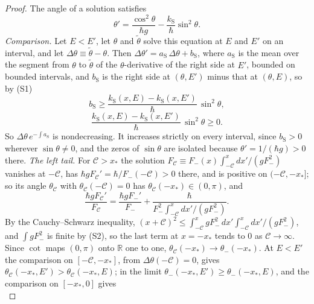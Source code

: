 \documentclass[aps,prd,onecolumn,tightenlines,nofootinbib,notitlepage,11pt,floatfix]{revtex4-2}
\theoremstyle{indentedtheorem}
\begin{document}
\begin{proof}
The angle of a solution satisfies
\begin{equation*}
    \theta' = \frac{\cos^2\theta}{\hbar g}-\frac{k_\text{S}}{\hbar}\sin^2\theta .
\end{equation*}
\emph{Comparison.} Let $E<E'$, let $\theta$ and $\tilde{\theta}$ solve this equation at $E$ and $E'$ on an interval, and let $\Delta\theta\equiv\tilde{\theta}-\theta$. Then $\Delta\theta'=a_\text{S}\,\Delta\theta+b_\text{S}$, where $a_\text{S}$ is the mean over the segment from $\theta$ to $\tilde{\theta}$ of the $\theta$-derivative of the right side at $E'$, bounded on bounded intervals, and $b_\text{S}$ is the right side at $(\theta,E')$ minus that at $(\theta,E)$, so by (S1)
\begin{equation*}
    b_\text{S} \geq \frac{k_\text{S}(x,E)-k_\text{S}(x,E')}{\hbar}\,\sin^2\theta ,
\end{equation*}
\begin{equation*}
    \frac{k_\text{S}(x,E)-k_\text{S}(x,E')}{\hbar}\,\sin^2\theta \geq 0 .
\end{equation*}
So $\Delta\theta\,e^{-\int a_\text{S}}$ is nondecreasing. It increases strictly on every interval, since $b_\text{S}>0$ wherever $\sin\theta\neq0$, and the zeros of $\sin\theta$ are isolated because $\theta'=1/(\hbar g)>0$ there.
\emph{The left tail.} For $\mathcal{C}>x_*$ the solution $F_\mathcal{C}\equiv F_-(x)\int_{-\mathcal{C}}^x dx'/(gF_-^2)$ vanishes at $-\mathcal{C}$, has $\hbar gF_\mathcal{C}'=\hbar/F_-(-\mathcal{C})>0$ there, and is positive on $(-\mathcal{C},-x_*]$; so its angle $\theta_\mathcal{C}$ with $\theta_\mathcal{C}(-\mathcal{C})=0$ has $\theta_\mathcal{C}(-x_*)\in(0,\pi)$, and
\begin{equation*}
    \frac{\hbar gF_\mathcal{C}'}{F_\mathcal{C}} = \frac{\hbar gF_-'}{F_-}+\frac{\hbar}{F_-^2\int_{-\mathcal{C}}^x dx'/(gF_-^2)} .
\end{equation*}
By the Cauchy--Schwarz inequality, $(x+\mathcal{C})^2\leq\int_{-\mathcal{C}}^xgF_-^2\,dx'\int_{-\mathcal{C}}^x dx'/(gF_-^2)$, and $\int gF_-^2$ is finite by (S2), so the last term at $x=-x_*$ tends to $0$ as $\mathcal{C}\to\infty$. Since $\cot$ maps $(0,\pi)$ onto $\mathbb{R}$ one to one, $\theta_\mathcal{C}(-x_*)\to\theta_-(-x_*)$. At $E<E'$ the comparison on $[-\mathcal{C},-x_*]$, from $\Delta\theta(-\mathcal{C})=0$, gives $\theta_\mathcal{C}(-x_*,E')>\theta_\mathcal{C}(-x_*,E)$; in the limit $\theta_-(-x_*,E')\geq\theta_-(-x_*,E)$, and the comparison on $[-x_*,0]$ gives
\begin{equation*}

\end{equation*}
\end{proof}
\end{document}
